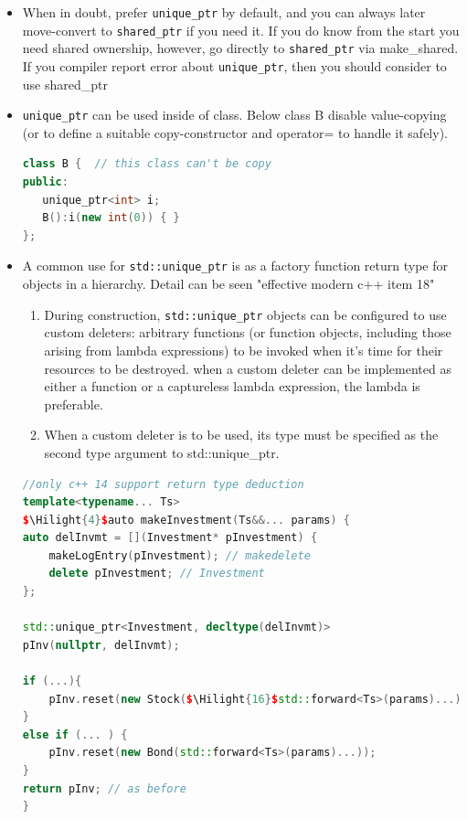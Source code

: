 \documentclass[a4paper,12pt,twoside]{book}
\newcommand{\Hilight}[1]{\makebox[0pt][l]{\color{yellow}\rule[-3pt]{#1em}{11pt}}}
\begin{document}
\begin{itemize}
\item When in doubt, prefer \texttt{unique\_ptr} by default, and you can always later move-convert to \texttt{shared\_ptr} if you need it. If you do know from the start you need shared ownership, however, go directly to \texttt{shared\_ptr} via make\_shared. If you compiler report error about \texttt{unique\_ptr}, then you should consider to use shared\_ptr

\item \texttt{unique\_ptr} can be used inside of class. Below class B disable value-copying (or to define a suitable copy-constructor  and operator= to handle it safely).
\begin{lstlisting}[frame=single, language=c++]
class B {  // this class can't be copy
public:
   unique_ptr<int> i;
   B():i(new int(0)) { }
};
\end{lstlisting}

\item A common use for \texttt{std::unique\_ptr} is as a factory function return type for objects
in a hierarchy. Detail can be seen "effective modern c++ item 18"

\begin{enumerate}
\item During construction, \texttt{std::unique\_ptr} objects can be configured to use custom deleters: arbitrary functions (or function objects, including those arising from lambda expressions) to be invoked when it's time for their resources to be destroyed. when a custom deleter can be implemented as either a function or a captureless lambda expression, the lambda is preferable.

\item When a custom deleter is to be used, its type must be specified as the second type argument to std::unique\_ptr.
\end{enumerate}

\begin{lstlisting}[frame=single, language=c++, mathescape=true]
//only c++ 14 support return type deduction
template<typename... Ts>
$\Hilight{4}$auto makeInvestment(Ts&&... params) {
auto delInvmt = [](Investment* pInvestment) {
	makeLogEntry(pInvestment); // makedelete
	delete pInvestment; // Investment
};

std::unique_ptr<Investment, decltype(delInvmt)>
pInv(nullptr, delInvmt);

if (...){
	pInv.reset(new Stock($\Hilight{16}$std::forward<Ts>(params)...));
}
else if (... ) {
	pInv.reset(new Bond(std::forward<Ts>(params)...));
}
return pInv; // as before
}
\end{lstlisting}


\end{itemize}
\end{document}
